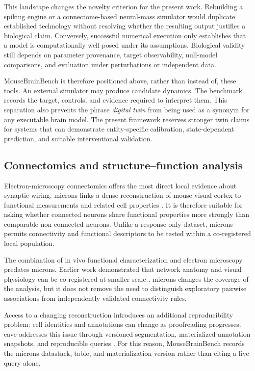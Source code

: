 \documentclass[a4paper,fleqn]{cas-sc}
\begin{document}
This landscape changes the novelty criterion for the present work. Rebuilding a
spiking engine or a connectome-based neural-mass simulator would duplicate
established technology without resolving whether the resulting output justifies
a biological claim. Conversely, successful numerical execution only establishes
that a model is computationally well posed under its assumptions. Biological
validity still depends on parameter provenance, target observability, null-model
comparisons, and evaluation under perturbations or independent data.

MouseBrainBench is therefore positioned above, rather than instead of, these
tools. An external simulator may produce candidate dynamics. The benchmark
records the target, controls, and evidence required to interpret them. This
separation also prevents the phrase \emph{digital twin} from being used as a
synonym for any executable brain model. The present framework reserves stronger
twin claims for systems that can demonstrate entity-specific calibration,
state-dependent prediction, and suitable interventional validation.

\subsection{Connectomics and structure--function analysis}
\label{subsec:connectomics}

Electron-microscopy connectomics offers the most direct local evidence about
synaptic wiring. \acs{microns} links a dense reconstruction of mouse visual cortex to
functional measurements and related cell properties \citep{bae2025microns}.
It is therefore suitable for asking whether connected neurons share functional
properties more strongly than comparable non-connected neurons. Unlike a
response-only dataset, \acs{microns} permits connectivity and functional descriptors
to be tested within a co-registered local population.

The combination of in vivo functional characterization and electron microscopy
predates \acs{microns}. Earlier work demonstrated that network anatomy and visual
physiology can be co-registered at smaller scale \citep{bock2011network}.
\acs{microns} changes the coverage of the analysis, but it does not remove the need to
distinguish exploratory pairwise associations from independently validated
connectivity rules.

Access to a changing reconstruction introduces an additional reproducibility
problem: cell identities and annotations can change as proofreading progresses.
\ac{cave} addresses this issue through versioned segmentation, materialized
annotation snapshots, and reproducible queries \citep{dorkenwald2025cave}. For
this reason, MouseBrainBench records the \acs{microns} datastack, table, and
materialization version rather than citing a live query alone.
\end{document}

